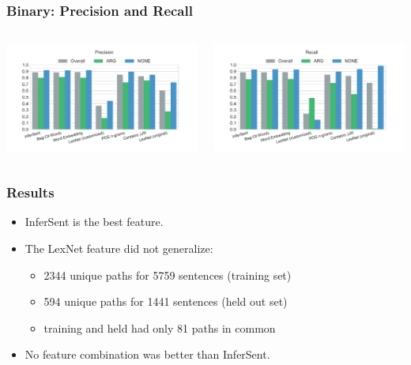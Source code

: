 \documentclass[11pt,aspectratio=169,usenames,dvipsnames]{beamer}
\begin{document}
    \begin{frame}[t]
        \frametitle{Binary: Precision and Recall}
        \begin{columns}[t]
            \column{2in}
            \centerline{\includegraphics[scale=0.31,trim={2cm 0 0 0},clip]{images/experiments/hp-precision-True}}
            \column{2in}
            \centerline{\includegraphics[scale=0.31,trim={0 0 2cm 0},clip]{images/experiments/hp-recall-True}}

        \end{columns}
    \end{frame}

    \begin{frame}[t]
        \frametitle{Results}
        \begin{itemize}
            \item InferSent is the best feature.
            \item The LexNet feature did not generalize:\pause
            \begin{itemize}
                \item 2344 unique paths for 5759 sentences (training set)
                \item 594 unique paths for 1441 sentences (held out set)
                \item training and held had only 81 paths in common
            \end{itemize}
            \item No feature combination was better than InferSent.
        \end{itemize}
    \end{frame}
\end{document}
